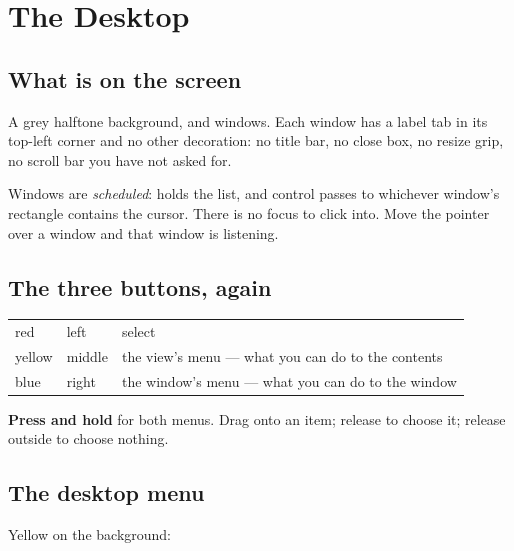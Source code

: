 \chapter{The Desktop}
\label{ch:desktop}


\section{What is on the screen}

A grey halftone background, and windows. Each window has a label tab in its
top-left corner and no other decoration: no title bar, no close box, no resize
grip, no scroll bar you have not asked for.

Windows are \emph{scheduled}:  holds the list, and
control passes to whichever window's rectangle contains the cursor. There is
no focus to click into. Move the pointer over a window and that window is
listening.

\section{The three buttons, again}

\begin{center}
\small
\begin{tabular}{@{}llp{}@{}}
\toprule
red & left & select\\
yellow & middle & the view's menu --- what you can do to the contents\\
blue & right & the window's menu --- what you can do to the window\\
\bottomrule
\end{tabular}
\end{center}

\textbf{Press and hold} for both menus. Drag onto an item; release to choose
it; release outside to choose nothing.

\section{The desktop menu}

Yellow on the background:

